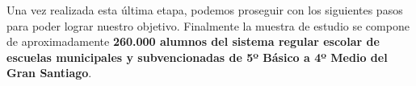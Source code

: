 Una vez realizada esta última etapa, podemos proseguir con los siguientes pasos para poder lograr nuestro objetivo. Finalmente la muestra de estudio se compone de aproximadamente \textbf{260.000 alumnos del sistema regular escolar de escuelas municipales y subvencionadas de 5º Básico a 4º Medio del Gran Santiago}.


